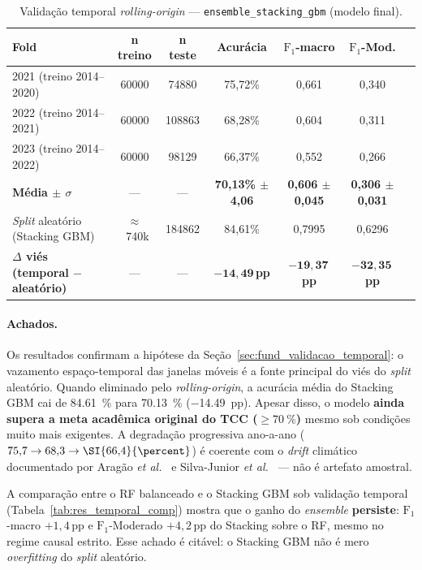 \begin{table}[h]
\centering
\caption{Validação temporal \emph{rolling-origin} --- \texttt{ensemble\_stacking\_gbm} (modelo final).}
\label{tab:res_temporal_stacking}
\small
\begin{tabular}{lcccccc}
\toprule
\textbf{Fold} & \textbf{n treino} & \textbf{n teste} & \textbf{Acurácia} & \textbf{$\text{F}_1$-macro} & \textbf{$\text{F}_1$-Mod.} \\
\midrule
2021 (treino 2014--2020) & \num{60000}  & \num{74880}  & 75,72\% & 0,661 & 0,340 \\
2022 (treino 2014--2021) & \num{60000}  & \num{108863} & 68,28\% & 0,604 & 0,311 \\
2023 (treino 2014--2022) & \num{60000}  & \num{98129}  & 66,37\% & 0,552 & 0,266 \\
\textbf{Média $\pm$ $\sigma$} & --- & --- & \textbf{70,13\% $\pm$ 4,06} & \textbf{0,606 $\pm$ 0,045} & \textbf{0,306 $\pm$ 0,031} \\
\midrule
\emph{Split} aleatório (Stacking GBM) & $\approx$~740k & \num{184862} & 84,61\% & 0,7995 & 0,6296 \\
\textbf{$\Delta$ viés (temporal $-$ aleatório)} & --- & --- & $\boldsymbol{-14{,}49}$\,\textbf{pp} & $\boldsymbol{-19{,}37}$\,\textbf{pp} & $\boldsymbol{-32{,}35}$\,\textbf{pp} \\
\bottomrule
\end{tabular}
\end{table}

\paragraph{Achados.} Os resultados confirmam a hipótese da Seção~\ref{sec:fund_validacao_temporal}: o vazamento espaço-temporal das janelas móveis é a fonte principal do viés do \emph{split} aleatório. Quando eliminado pelo \emph{rolling-origin}, a acurácia média do Stacking GBM cai de \SI{84,61}{\percent} para \SI{70,13}{\percent} ($-$\SI{14,49}{pp}). Apesar disso, o modelo \textbf{ainda supera a meta acadêmica original do TCC ($\geq \SI{70}{\percent}$)} mesmo sob condições muito mais exigentes. A degradação progressiva ano-a-ano (\(75{,}7 \to 68{,}3 \to \SI{66{,}4}{\percent}\)) é coerente com o \emph{drift} climático documentado por Aragão \emph{et al.}~\cite{aragao2018amazon} e Silva-Junior \emph{et al.}~\cite{silvajunior2025amazon} --- não é artefato amostral.

A comparação entre o RF balanceado e o Stacking GBM sob validação temporal (Tabela~\ref{tab:res_temporal_comp}) mostra que o ganho do \emph{ensemble} \textbf{persiste}: \(\text{F}_1\)-macro \(+1{,}4\,\text{pp}\) e \(\text{F}_1\)-Moderado \(+4{,}2\,\text{pp}\) do Stacking sobre o RF, mesmo no regime causal estrito. Esse achado é citável: o Stacking GBM não é mero \emph{overfitting} do \emph{split} aleatório.

